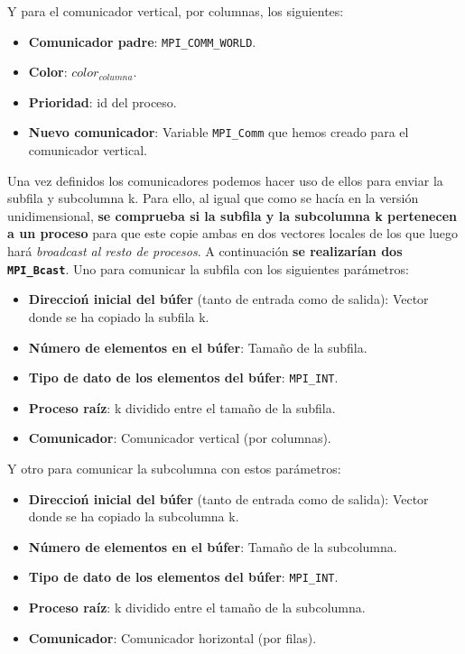 Y para el comunicador vertical, por columnas, los siguientes:
\begin{itemize}
	\item \textbf{Comunicador padre}: \texttt{MPI\_COMM\_WORLD}.
	\item \textbf{Color}: $ color_{columna} $.
	\item \textbf{Prioridad}: id del proceso.
	\item \textbf{Nuevo comunicador}: Variable \texttt{MPI\_Comm} que hemos creado para el comunicador vertical.
\end{itemize}

Una vez definidos los comunicadores podemos hacer uso de ellos para enviar la subfila y subcolumna k. Para ello, al igual que como se hacía en la versión unidimensional, \textbf{se comprueba si la subfila y la subcolumna k pertenecen a un proceso} para que este copie ambas en dos vectores locales de los que luego hará \textit{broadcast al resto de procesos}. A continuación \textbf{se realizarían dos \texttt{MPI\_Bcast}}. Uno para comunicar la subfila con los siguientes parámetros:
\begin{itemize}
	\item \textbf{Direccioń inicial del búfer} (tanto de entrada como de salida): Vector donde se ha copiado la subfila k.
	\item \textbf{Número de elementos en el búfer}: Tamaño de la subfila.
	\item \textbf{Tipo de dato de los elementos del búfer}: \texttt{MPI\_INT}.
	\item \textbf{Proceso raíz}: k dividido entre el tamaño de la subfila.
	\item \textbf{Comunicador}: Comunicador vertical (por columnas).
\end{itemize}

Y otro para comunicar la subcolumna con estos parámetros:
\begin{itemize}
	\item \textbf{Direccioń inicial del búfer} (tanto de entrada como de salida): Vector donde se ha copiado la subcolumna k.
	\item \textbf{Número de elementos en el búfer}: Tamaño de la subcolumna.
	\item \textbf{Tipo de dato de los elementos del búfer}: \texttt{MPI\_INT}.
	\item \textbf{Proceso raíz}: k dividido entre el tamaño de la subcolumna.
	\item \textbf{Comunicador}: Comunicador horizontal (por filas).
\end{itemize}

